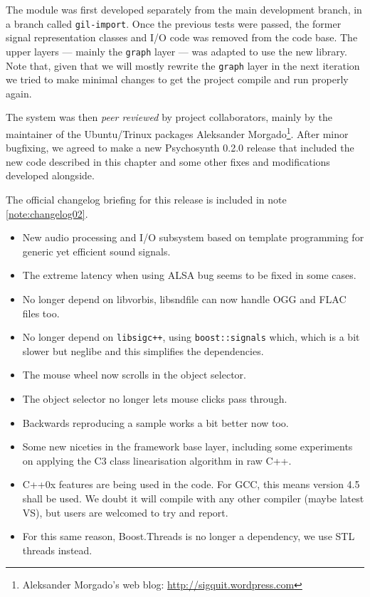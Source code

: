 The module was first developed separately from the main development
branch, in a branch called \texttt{gil-import}. Once the previous
tests were passed, the former signal representation classes and I/O
code was removed from the code base. The upper layers --- mainly the
\texttt{graph} layer --- was adapted to use the new library. Note
that, given that we will mostly rewrite the \texttt{graph} layer in
the next iteration we tried to make minimal changes to get the project
compile and run properly again.

The system was then \emph{peer reviewed} by project
collaborators, mainly by the maintainer of the Ubuntu/Trinux packages
Aleksander Morgado\footnote{Aleksander Morgado's web blog:
  \url{http://sigquit.wordpress.com}}. After minor bugfixing, we
agreed to make a new Psychosynth 0.2.0 release that included the new
code described in this chapter and some other fixes and modifications
developed alongside.

The official changelog briefing for this release is included in note
\ref{note:changelog02}. 

\begin{mynote}
\label{note:changelog02}
\begin{itemize}
\item New audio processing and I/O subsystem based on template
  programming for generic yet efficient sound signals.

\item The extreme latency when using ALSA bug seems to be fixed in
  some cases.

\item No longer depend on libvorbis, libsndfile can now handle OGG and
  FLAC files too.

\item No longer depend on \texttt{libsigc++}, using
  \texttt{boost::signals} which, which is a bit slower but neglibe and
  this simplifies the dependencies.

\item The mouse wheel now scrolls in the object selector.

\item The object selector no longer lets mouse clicks pass through.  

\item Backwards reproducing a sample works a bit better now too.

\item Some new niceties in the framework base layer, including some
  experiments on applying the C3 class linearisation algorithm in raw
  C++.

\item C++0x features are being used in the code. For GCC, this means
  version 4.5 shall be used. We doubt it will compile with any other
  compiler (maybe latest VS), but users are welcomed to try and
  report.

\item For this same reason, Boost.Threads is no longer a dependency,
  we use STL threads instead.
\end{itemize}
\end{mynote}

